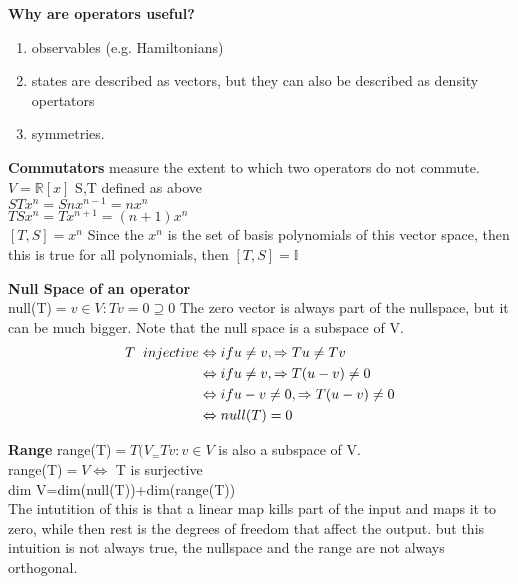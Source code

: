 \documentclass{article}
\begin{document}
{\textbf{Why are operators useful?}
\begin{enumerate}
\item observables (e.g. Hamiltonians)
\item states are described as vectors, but they can also be described as density opertators
\item symmetries. 
\end{enumerate}

\vspace{5mm}
\textbf{Commutators} measure the extent to which two operators do not commute.\\
$V=\mathbb{R}[x]$ S,T defined as above\\
$STx^n=Snx^{n-1}=nx^n$\\
$TSx^n=Tx^{n+1}=(n+1)x^n$\\
$[T,S]=x^n$ Since the ${x^n}$ is the set of basis polynomials of this vector space, then this is true for all polynomials, then $[T,S]=\mathbb{I}$
\vspace{5mm}

\textbf{Null Space of an operator}\\
null(T)$={v\in V:Tv=0}\supseteq 0$ The zero vector is always part of the nullspace, but it can be much bigger. Note that the null space is a subspace of V. \\
\begin{align}
T \hspace {2mm} injective & \Leftrightarrow if u\neq v, \Rightarrow Tu \neq Tv \\
& \Leftrightarrow if u\neq v, \Rightarrow T(u-v) \neq 0\\
& \Leftrightarrow if u-v \neq 0, \Rightarrow T(u-v) \neq 0\\
& \Leftrightarrow null(T)={0}
\end{align}

\vspace{5mm}
\textbf{Range}
range(T)$=T(V_={Tv:v \in V}$ is also a subspace of V. \\
range(T)$=V \Leftrightarrow$ T is surjective\\
dim V=dim(null(T))+dim(range(T))\\
The intutition of this is that a linear map kills part of the input and maps it to zero, while then rest is the degrees of freedom that affect the output. but this intuition is not always true, the nullspace and the range are not always orthogonal.\\

}
\end{document}
